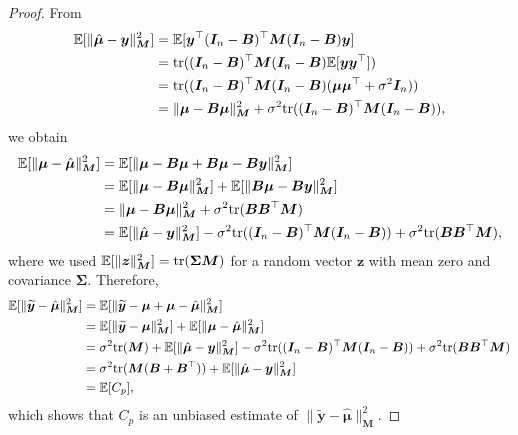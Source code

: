 \documentclass[final,onefignum,onetabnum]{siamart220329}
\newcommand{\vct}[1]{\bm{#1}}
\newcommand{\mtx}[1]{\bm{#1}}
\begin{document}
\begin{proof}
	From
	\begin{align*}
		{\mathbb{E}} [ \| \hat{\vct{\mu}}-\vct{y} \|_{\mtx{M}}^2] &= {\mathbb{E}} [\vct{y}^{\top} (\mtx{I}_n-\mtx{B})^{\top} \mtx{M} (\mtx{I}_n-\mtx{B}) \vct{y}] \\
		&= {\rm tr} ((\mtx{I}_n-\mtx{B})^{\top} \mtx{M} (\mtx{I}_n-\mtx{B}) {\mathbb{E}} [\vct{y} \vct{y}^{\top}]) \\
		&= {\rm tr} ((\mtx{I}_n-\mtx{B})^{\top} \mtx{M} (\mtx{I}_n-\mtx{B}) (\vct{\mu} \vct{\mu}^{\top}+\sigma^2 \mtx{I}_n)) \\
		&= \| \vct{\mu} -\mtx{B} \vct{\mu} \|_{\mtx{M}}^2 + \sigma^2 {\rm tr} ((\mtx{I}_n-\mtx{B})^{\top} \mtx{M} (\mtx{I}_n-\mtx{B})),
	\end{align*}
	we obtain
	\begin{align*}
		{\mathbb{E}} [ \| {\vct{\mu}}-\hat{\vct{\mu}} \|_{\mtx{M}}^2 ] &= {\mathbb{E}} [ \| {\vct{\mu}}-\mtx{B} \vct{\mu}+\mtx{B} \vct{\mu}-\mtx{B} \vct{y} \|_{\mtx{M}}^2 ] \\
		&= {\mathbb{E}} [\| {\vct{\mu}}-\mtx{B} \vct{\mu} \|_{\mtx{M}}^2] + {\mathbb{E}} [\| \mtx{B} \vct{\mu}-\mtx{B} \vct{y} \|_{\mtx{M}}^2] \\
		&= \| {\vct{\mu}}-\mtx{B} \vct{\mu} \|_{\mtx{M}}^2 + \sigma^2 {\rm tr} (\mtx{B} \mtx{B}^{\top} \mtx{M}) \\
		&= {\mathbb{E}} [\| \hat{\vct{\mu}}-\vct{y} \|_{\mtx{M}}^2] - \sigma^2 {\rm tr} ((\mtx{I}_n-\mtx{B})^{\top} \mtx{M} (\mtx{I}_n-\mtx{B})) + \sigma^2 {\rm tr} (\mtx{B} \mtx{B}^{\top} \mtx{M}),
	\end{align*}
	where we used ${\mathbb{E}} [\| \vct{z} \|_{\mtx{M}}^2] = {\rm tr} (\mtx{\Sigma} \mtx{M})$ for a random vector $\vct{z}$ with mean zero and covariance $\mtx{\Sigma}$.
	Therefore,
	\begin{align*}
		{\mathbb{E}} [\| \widetilde{\vct{y}}-\hat{\vct{\mu}} \|_{\mtx{M}}^2] &= {\mathbb{E}} [\| \widetilde{\vct{y}}-\vct{\mu}+\vct{\mu}-\hat{\vct{\mu}} \|_{\mtx{M}}^2] \\
		&={\mathbb{E}} [\| \widetilde{\vct{y}}-{\vct{\mu}} \|_{\mtx{M}}^2] + {\mathbb{E}} [\| {\vct{\mu}}-\hat{\vct{\mu}} \|_{\mtx{M}}^2] \\
		&= \sigma^2 {\rm tr} (\mtx{M}) +{\mathbb{E}} [\| \hat{\vct{\mu}}-\vct{y} \|_{\mtx{M}}^2] - \sigma^2 {\rm tr} ((\mtx{I}_n-\mtx{B})^{\top} \mtx{M} (\mtx{I}_n-\mtx{B})) + \sigma^2 {\rm tr} (\mtx{B} \mtx{B}^{\top} \mtx{M}) \\
		&= \sigma^2 {\rm tr} (\mtx{M} (\mtx{B}+\mtx{B}^{\top})) + {\mathbb{E}} [\| \hat{\vct{\mu}}-\vct{y} \|_{\mtx{M}}^2] \\
		&= {\mathbb{E}} [C_p],
	\end{align*}
	which shows that $C_p$ is an unbiased estimate of $\| \widetilde{\vct{y}}-\hat{\vct{\mu}} \|_{\mtx{M}}^2$. 
\end{proof}
\end{document}

